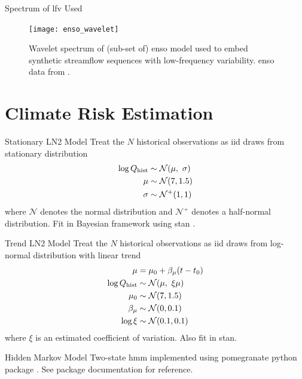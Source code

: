 \documentclass[
  10pt,     %
]{beamer}
\newcommand{\normal}{\mathcal{N}}
\begin{document}
\begin{frame}{Spectrum of \gls{lfv} Used}
  \begin{figure}
    \texttt{[image: enso\_wavelet]}
    \caption{
      Wavelet spectrum of (sub-set of) \gls{enso} model used to embed synthetic streamflow sequences with low-frequency variability.
      \gls{enso} data from \citet{Ramesh:2016hf}.
    }
  \end{figure}
\end{frame}

\section{Climate Risk Estimation}

\begin{frame}{Stationary LN2 Model}
  Treat the $N$ historical observations as \gls{iid} draws from stationary distribution
  \begin{align}\label{eq:ln2-stationary}
    \begin{split}
      \log Q_\text{hist} & \sim \normal \qty(\mu, \ \sigma) \\
      \mu &\sim \normal \qty(7, 1.5) \\
      \sigma &\sim \normal^+ \qty(1, 1)
    \end{split}
  \end{align}
  where $\normal$ denotes the normal distribution and $\normal^+$ denotes a half-normal distribution.
  Fit in Bayesian framework using stan \citep{Carpenter:2017ke}.
\end{frame}

\begin{frame}{Trend LN2 Model}
  Treat the $N$ historical observations as \gls{iid} draws from log-normal distribution with linear trend
  \begin{align}\label{eq:ln2-trend}
    \begin{split}
      \mu &= \mu_0 + \beta_\mu \qty(t - t_0) \\
    \log Q_\text{hist} & \sim \normal \qty(\mu, \ \xi \mu) \\
    \mu_0 & \sim \normal \qty(7, 1.5) \\
    \beta_\mu & \sim \normal \qty(0, 0.1) \\
    \log \xi & \sim \normal \qty(0.1, 0.1)
    \end{split}
  \end{align}
  where $\xi$ is an estimated coefficient of variation.
  Also fit in stan.
\end{frame}

\begin{frame}{Hidden Markov Model}
  Two-state \gls{hmm} \citep[see][]{Rabiner:1986jk} implemented using pomegranate python package \citep{Schreiber:2017tg}.
  See package documentation for reference.
\end{frame}
\end{document}
